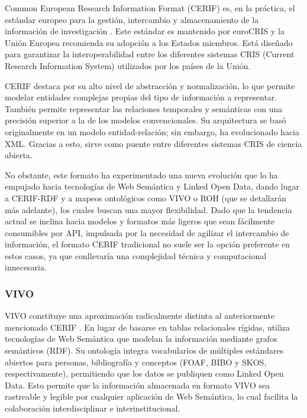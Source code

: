 \documentclass[12pt,a4paper]{article}
\begin{document}
Common European Research Information Format (CERIF) es, en la práctica, el estándar europeo para la gestión, intercambio y almacenamiento de la información de investigación \cite{eurocris_cerif}. Este estándar es mantenido por euroCRIS y la Unión Europea recomienda su adopción a los Estados miembros. Está diseñado para garantizar la interoperabilidad entre los diferentes sistemas CRIS (Current Research Information System) utilizados por los países de la Unión.

CERIF destaca por su alto nivel de abstracción y normalización, lo que permite modelar entidades complejas propias del tipo de información a representar. También permite representar las relaciones temporales y semánticas con una precisión superior a la de los modelos convencionales. Su arquitectura se basó originalmente en un modelo entidad-relación; sin embargo, ha evolucionado hacia XML. Gracias a esto, sirve como puente entre diferentes sistemas CRIS de ciencia abierta.

No obstante, este formato ha experimentado una nueva evolución que lo ha empujado hacia tecnologías de Web Semántica y Linked Open Data, dando lugar a CERIF-RDF y a mapeos ontológicos como VIVO o ROH (que se detallarán más adelante), los cuales buscan una mayor flexibilidad. Dado que la tendencia actual se inclina hacia modelos y formatos más ligeros que sean fácilmente consumibles por API, impulsada por la necesidad de agilizar el intercambio de información, el formato CERIF tradicional no suele ser la opción preferente en estos casos, ya que conllevaría una complejidad técnica y computacional innecesaria.

\subsubsection{VIVO}

VIVO constituye una aproximación radicalmente distinta al anteriormente mencionado CERIF \cite{vivo_project}. En lugar de basarse en tablas relacionales rígidas, utiliza tecnologías de Web Semántica que modelan la información mediante grafos semánticos (RDF). Su ontología integra vocabularios de múltiples estándares abiertos para personas, bibliografía y conceptos (FOAF, BIBO y SKOS, respectivamente), permitiendo que los datos se publiquen como Linked Open Data. Esto permite que la información almacenada en formato VIVO sea rastreable y legible por cualquier aplicación de Web Semántica, lo cual facilita la colaboración interdisciplinar e interinstitucional.
\end{document}
